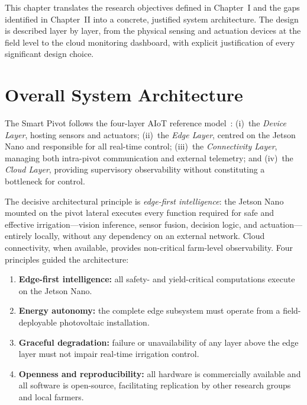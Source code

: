 \documentclass[12pt,a4paper]{report}
\begin{document}
This chapter translates the research objectives defined in Chapter~I and the gaps identified in Chapter~II into a concrete, justified system architecture. The design is described layer by layer, from the physical sensing and actuation devices at the field level to the cloud monitoring dashboard, with explicit justification of every significant design choice.

\section{Overall System Architecture}

The Smart Pivot follows the four-layer AIoT reference model~\cite{Muhammed2024}: (i)~the \emph{Device Layer}, hosting sensors and actuators; (ii)~the \emph{Edge Layer}, centred on the Jetson Nano and responsible for all real-time control; (iii)~the \emph{Connectivity Layer}, managing both intra-pivot communication and external telemetry; and (iv)~the \emph{Cloud Layer}, providing supervisory observability without constituting a bottleneck for control.

The decisive architectural principle is \emph{edge-first intelligence}: the Jetson Nano mounted on the pivot lateral executes every function required for safe and effective irrigation---vision inference, sensor fusion, decision logic, and actuation---entirely locally, without any dependency on an external network. Cloud connectivity, when available, provides non-critical farm-level observability. Four principles guided the architecture:

\begin{enumerate}
    \item \textbf{Edge-first intelligence:} all safety- and yield-critical computations execute on the Jetson Nano.
    \item \textbf{Energy autonomy:} the complete edge subsystem must operate from a field-deployable photovoltaic installation.
    \item \textbf{Graceful degradation:} failure or unavailability of any layer above the edge layer must not impair real-time irrigation control.
    \item \textbf{Openness and reproducibility:} all hardware is commercially available and all software is open-source, facilitating replication by other research groups and local farmers.
\end{enumerate}
\end{document}
